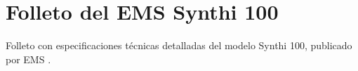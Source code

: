  \chapter[Folleto del EMS Synthi 100]{Folleto del EMS Synthi 100}

Folleto con especificaciones técnicas detalladas del modelo Synthi 100, publicado por EMS \citeyear{Synthi100_brochure}.  




